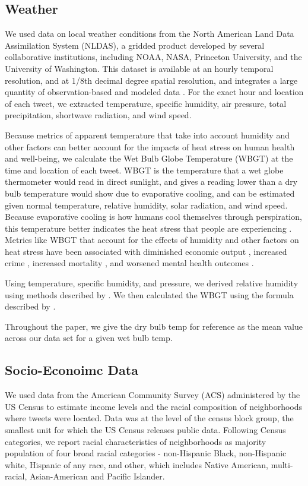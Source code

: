 \documentclass[fleqn,10pt]{wlscirep}
\begin{document}
\subsection*{Weather}
We used data on local weather conditions from the North American Land Data Assimilation System (NLDAS), a gridded product developed by several collaborative institutions, including NOAA, NASA, Princeton University, and the University of Washington.  This dataset is available at an hourly temporal resolution, and at 1/8th decimal degree spatial resolution, and integrates a large quantity of observation-based and modeled data  \cite{xia_continental-scale_2012}.  For the exact hour and location of each tweet, we extracted temperature, specific humidity, air pressure, total precipitation, shortwave radiation, and wind speed.  

Because metrics of apparent temperature that take into account humidity and other factors can better account for the impacts of heat stress on human health and well-being, we calculate the Wet Bulb Globe Temperature (WBGT) at the time and location of each tweet.  WBGT is the temperature that a wet globe thermometer would read in direct sunlight, and gives a reading lower than a dry bulb temperature would show due to evaporative cooling, and can be estimated given normal temperature, relative humidity, solar radiation, and wind speed.  Because evaporative cooling is how humans cool themselves through perspiration, this temperature better indicates the heat stress that people are experiencing \cite{budd2008wet}.  Metrics like WBGT that account for the effects of humidity and other factors on heat stress have been associated with diminished economic output \cite{rao2020projections}, increased crime \cite{hu2017impact}, increased mortality \cite{chien2016spatiotemporal, armstrong2019role}, and worsened mental health outcomes \cite{vida2012relationship, ding2016importance}.

Using temperature, specific humidity, and pressure, we derived relative humidity using methods described by  \cite{bolton_computation_1980}.  We then calculated the WBGT using the formula described by \cite{heo2019comparison}.

Throughout the paper, we give the dry bulb temp for reference as the mean value across our data set for a given wet bulb temp.

\subsection*{Socio-Econoimc Data}
We used data from the American Community Survey (ACS) administered by the US Census to estimate income levels and the racial composition of neighborhoods where tweets were located.  Data was at the level of the census block group, the smallest unit for which the US Census releases public data. Following Census categories, we report racial characteristics of neighborhoods as majority population of four broad racial categories - non-Hispanic Black, non-Hispanic white, Hispanic of any race, and other, which includes Native American, multi-racial, Asian-American and Pacific Islander. 
\end{document}
